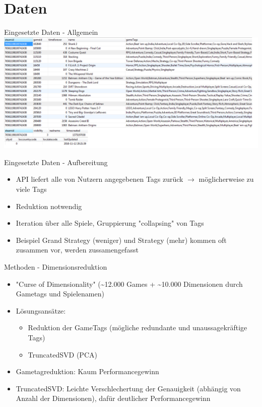 \documentclass[12pt]{beamer}
\begin{document}
\section{Daten}
\begin{frame}{Eingesetzte Daten - Allgemein}
\includegraphics[scale=0.5]{steam_richard_info.png}
\end{frame}

\begin{frame}{Eingesetzte Daten - Aufbereitung}
\begin{itemize}
\item API liefert alle von Nutzern angegebenen Tags zurück $\rightarrow$ möglicherweise zu viele Tags
\item Reduktion notwendig
\item Iteration über alle Spiele, Gruppierung "collapsing" von Tags
\item Beispiel Grand Strategy (weniger) und Strategy (mehr) kommen oft zusammen vor, werden zussamengefasst
\end{itemize}

\end{frame}


\begin{frame}{Methoden - Dimensionsreduktion}
\begin{itemize}
\item "Curse of Dimensionality" (\textasciitilde 12.000 Games + \textasciitilde 10.000 Dimensionen durch Gametags und Spielenamen)
\item Lösungsansätze:
\begin{itemize}
\item Reduktion der GameTags (mögliche redundante und unaussagekräftige Tags)
\item TruncatedSVD (PCA)
\end{itemize}
\item Gametagreduktion: Kaum Performancegewinn
\item TruncatedSVD: Leichte Verschlechertung der Genauigkeit (abhängig von Anzahl der Dimensionen), dafür deutlicher Performancegewinn
\end{itemize}
\end{frame}
\end{document}
